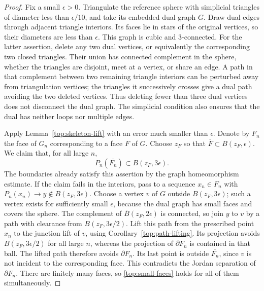 \begin{proof}
Fix a small $\epsilon>0$.  Triangulate the reference sphere with
simplicial triangles of diameter less than $\epsilon/10$, and take
its embedded dual graph $G$.  Draw dual edges through adjacent
triangle interiors.  Its faces lie in stars of the original vertices,
so their diameters are less than $\epsilon$.
This graph is cubic and $3$-connected.  For the latter assertion,
delete any two dual vertices, or equivalently the corresponding
two closed triangles.  Their union has connected complement in
the sphere, whether the triangles are disjoint, meet at a vertex,
or share an edge.  A path in that complement between two remaining
triangle interiors can be perturbed away from triangulation
vertices; the triangles it successively crosses give a dual path
avoiding the two deleted vertices.  Thus deleting fewer than three
dual vertices does not disconnect the dual graph.  The simplicial
condition also ensures that the dual has neither loops nor multiple
edges.

Apply Lemma~\ref{top:skeleton-lift} with an error much smaller than
$\epsilon$.  Denote by $F_n$ the face of $G_n$ corresponding to a
face $F$ of $G$.  Choose $z_F$ so that
$\overline F\subset B(z_F,\epsilon)$.  We claim that, for all
large $n$,
\begin{equation}\label{top:small-faces}
 P_n(\overline{F_n})\subset B(z_F,3\epsilon).
\end{equation}
The boundaries already satisfy this assertion by the graph
homeomorphism estimate.  If the claim fails in the interiors,
pass to a sequence $x_n\in F_n$ with
$P_n(x_n)\to y\notin B(z_F,3\epsilon)$.  Choose a vertex $v$ of
$G$ outside $B(z_F,3\epsilon)$; such a vertex exists for sufficiently
small $\epsilon$, because the dual graph has small faces and covers
the sphere.  The complement of
$\overline B(z_F,2\epsilon)$ is connected, so join $y$ to $v$ by
a path with clearance from $B(z_F,3\epsilon/2)$.  Lift this path
from the prescribed point $x_n$ to the junction lift of $v$, using
Corollary~\ref{top:path-lifting}.  Its projection avoids
$B(z_F,3\epsilon/2)$ for all large $n$, whereas the projection of
$\partial F_n$ is contained in that ball.  The lifted path
therefore avoids $\partial F_n$.  Its last point is outside
$\overline{F_n}$, since $v$ is not incident to the corresponding
face.  This contradicts the Jordan separation of $\partial F_n$.
There are finitely many faces, so \eqref{top:small-faces} holds
for all of them simultaneously.


\end{proof}

